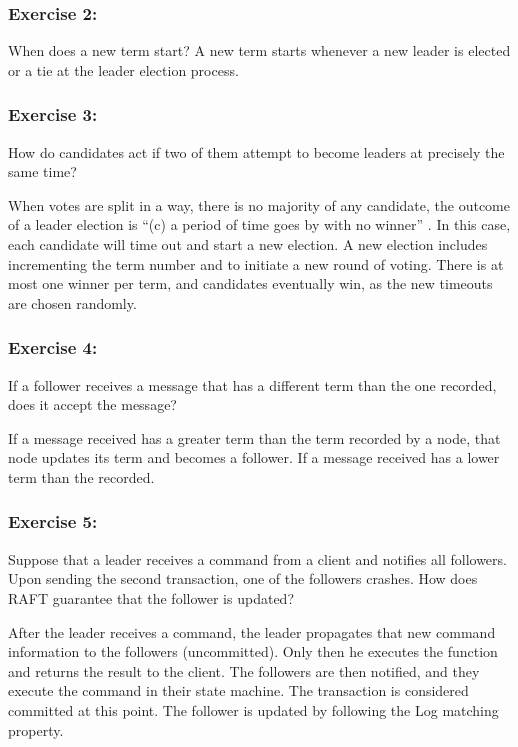 \documentclass[12pt,a4paper]{article}
\begin{document}
\subsubsection*{Exercise 2:} When does a new term start?
A new term starts whenever a new leader is elected or a tie at the leader election process.


\subsubsection*{Exercise 3:} How do candidates act if two of them attempt to become leaders at precisely the same time?


When votes are split in a way, there is no majority of any candidate, the outcome of a leader election is ``(c) a period of time goes by with no winner'' \cite{raft_paper}. In this case, each candidate will time out and start a new election. A new election includes incrementing the term number and to initiate a new round of voting. There is at most one winner per term, and candidates eventually win, as the new timeouts are chosen randomly.


\subsubsection*{Exercise 4:} If a follower receives a message that has a different term than the one recorded, does it accept the message?

If a message received has a greater term than the term recorded by a node, that node updates its term and becomes a follower. If a message received has a lower term than the recorded.


\subsubsection*{Exercise 5:} Suppose that a leader receives a command from a client and notifies all followers. Upon sending the second transaction, one of the followers crashes. How does RAFT guarantee that the follower is updated?

After the leader receives a command, the leader propagates that new command information to the followers (uncommitted). Only then he executes the function and returns the result to the client. The followers are then notified, and they execute the command in their state machine. The transaction is considered committed at this point. The follower is updated by following the Log matching property.
\end{document}
